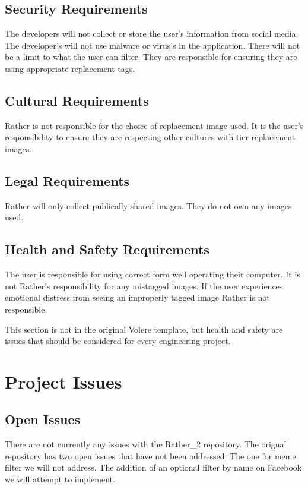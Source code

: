 \documentclass[12pt, titlepage]{article}
\begin{document}
\subsection{Security Requirements}
The developers will not collect or store the user's information from social media. The developer's will not use malware or virus's in the application. There will not be a limit to what the user can filter. They are responsible for ensuring they are using appropriate replacement tags. 

\subsection{Cultural Requirements}
Rather is not responsible for the choice of replacement image used. It is the user's responsibility to ensure they are respecting other cultures with tier replacement images.

\subsection{Legal Requirements}
Rather will only collect publically shared images. They do not own any images used. 

\subsection{Health and Safety Requirements}
The user is responsible for using correct form well operating their computer. It is not Rather's responsibility for any mistagged images. If the user experiences emotional distress from seeing an improperly tagged image Rather is not responsible. 

This section is not in the original Volere template, but health and safety are
issues that should be considered for every engineering project.

\section{Project Issues}

\subsection{Open Issues}
There are not currently any issues with the Rather_2 repository. The orignal repository has two open issues that have not been addressed. The one for meme filter we will not address. The addition of an optional filter by name on Facebook we will attempt to implement. 
\end{document}
